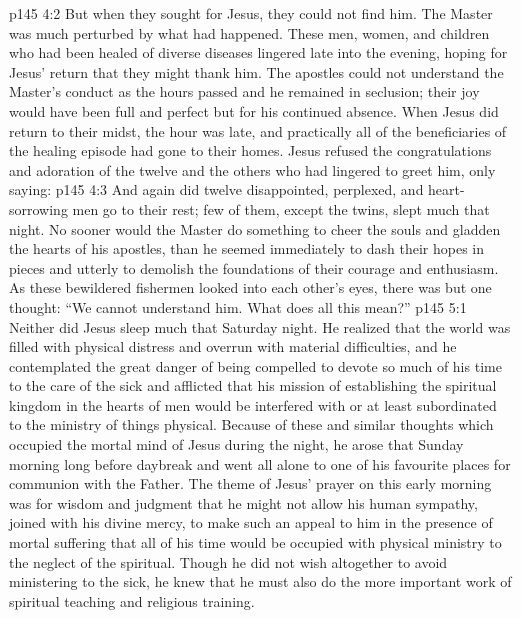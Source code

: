 \vs p145 4:2 But when they sought for Jesus, they could not find him. The Master was much perturbed by what had happened. These men, women, and children who had been healed of diverse diseases lingered late into the evening, hoping for Jesus’ return that they might thank him. The apostles could not understand the Master’s conduct as the hours passed and he remained in seclusion; their joy would have been full and perfect but for his continued absence. When Jesus did return to their midst, the hour was late, and practically all of the beneficiaries of the healing episode had gone to their homes. Jesus refused the congratulations and adoration of the twelve and the others who had lingered to greet him, only saying: 
\vs p145 4:3 And again did twelve disappointed, perplexed, and heart\hyp{}sorrowing men go to their rest; few of them, except the twins, slept much that night. No sooner would the Master do something to cheer the souls and gladden the hearts of his apostles, than he seemed immediately to dash their hopes in pieces and utterly to demolish the foundations of their courage and enthusiasm. As these bewildered fishermen looked into each other’s eyes, there was but one thought: “We cannot understand him. What does all this mean?”
\vs p145 5:1 Neither did Jesus sleep much that Saturday night. He realized that the world was filled with physical distress and overrun with material difficulties, and he contemplated the great danger of being compelled to devote so much of his time to the care of the sick and afflicted that his mission of establishing the spiritual kingdom in the hearts of men would be interfered with or at least subordinated to the ministry of things physical. Because of these and similar thoughts which occupied the mortal mind of Jesus during the night, he arose that Sunday morning long before daybreak and went all alone to one of his favourite places for communion with the Father. The theme of Jesus’ prayer on this early morning was for wisdom and judgment that he might not allow his human sympathy, joined with his divine mercy, to make such an appeal to him in the presence of mortal suffering that all of his time would be occupied with physical ministry to the neglect of the spiritual. Though he did not wish altogether to avoid ministering to the sick, he knew that he must also do the more important work of spiritual teaching and religious training.
